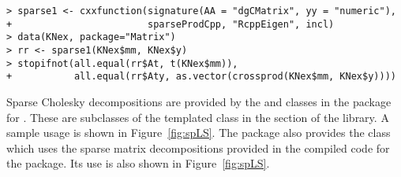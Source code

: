 \documentclass[shortnames,article]{jss}
\begin{document}
\begin{verbatim}
> sparse1 <- cxxfunction(signature(AA = "dgCMatrix", yy = "numeric"),
+                        sparseProdCpp, "RcppEigen", incl)
> data(KNex, package="Matrix")
> rr <- sparse1(KNex$mm, KNex$y)
> stopifnot(all.equal(rr$At, t(KNex$mm)),
+           all.equal(rr$Aty, as.vector(crossprod(KNex$mm, KNex$y))))
\end{verbatim}

Sparse Cholesky decompositions are provided by the
 and  classes in the
 package for .  These are
subclasses of the  templated class in the
 section of the  library.  A sample usage
is shown in Figure~\ref{fig:spLS}.  The  package also
provides the  class which uses the
 sparse matrix decompositions provided in the compiled
code for the  package.  Its use is also shown in
Figure~\ref{fig:spLS}.
\end{document}
